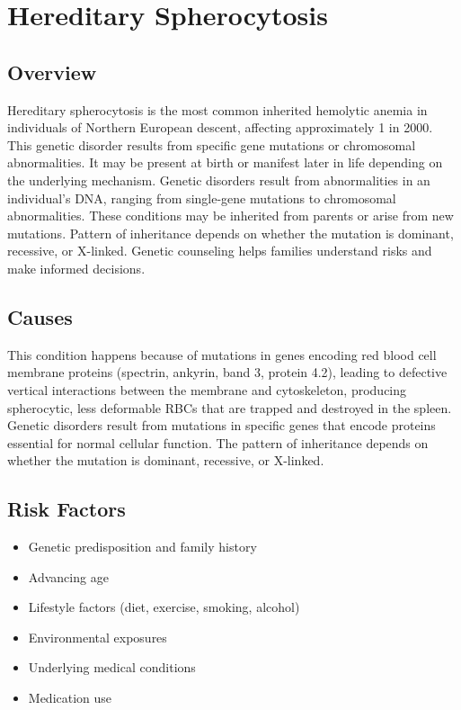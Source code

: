\chapter{Hereditary Spherocytosis}
\label{sec:Hereditary Spherocytosis}

\section{Overview}
Hereditary spherocytosis is the most common inherited hemolytic anemia in individuals of Northern European descent, affecting approximately 1 in 2000. This genetic disorder results from specific gene mutations or chromosomal abnormalities. It may be present at birth or manifest later in life depending on the underlying mechanism. Genetic disorders result from abnormalities in an individual's DNA, ranging from single-gene mutations to chromosomal abnormalities. These conditions may be inherited from parents or arise from new mutations. Pattern of inheritance depends on whether the mutation is dominant, recessive, or X-linked. Genetic counseling helps families understand risks and make informed decisions.
\section{Causes}
This condition happens because of mutations in genes encoding red blood cell membrane proteins (spectrin, ankyrin, band 3, protein 4.2), leading to defective vertical interactions between the membrane and cytoskeleton, producing spherocytic, less deformable RBCs that are trapped and destroyed in the spleen. Genetic disorders result from mutations in specific genes that encode proteins essential for normal cellular function. The pattern of inheritance depends on whether the mutation is dominant, recessive, or X-linked.   
\section{Risk Factors}

\begin{itemize}[noitemsep]
  \item Genetic predisposition and family history
  \item Advancing age
  \item Lifestyle factors (diet, exercise, smoking, alcohol)
  \item Environmental exposures
  \item Underlying medical conditions
  \item Medication use
\end{itemize}
